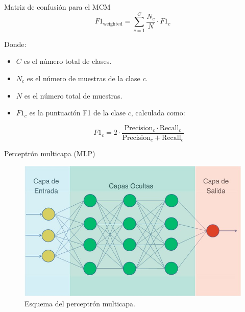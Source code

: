 \begin{frame}{Matriz de confusión para el MCM}
\scriptsize
\begin{equation*}
F1_{\text{weighted}} = \sum_{c=1}^{C} \frac{N_c}{N} \cdot F1_c
\end{equation*}

Donde:
\begin{itemize}
    \item \( C \) es el número total de clases.
    \item \( N_c \) es el número de muestras de la clase \( c \).
    \item \( N \) es el número total de muestras.
    \item \( F1_c \) es la puntuación F1 de la clase \( c \), calculada como:
    

\[
    F1_c = 2 \cdot \frac{\text{Precision}_c \cdot \text{Recall}_c}{\text{Precision}_c + \text{Recall}_c}
    \]


\end{itemize}



\end{frame}


\begin{frame}{Perceptrón multicapa (MLP)}
	\begin{figure}
		\centering
	    \includegraphics[width=\linewidth]{../Memoria/img/modelo/capas.png}
    		\caption{Esquema del perceptrón multicapa.}
	\end{figure}
\end{frame}



